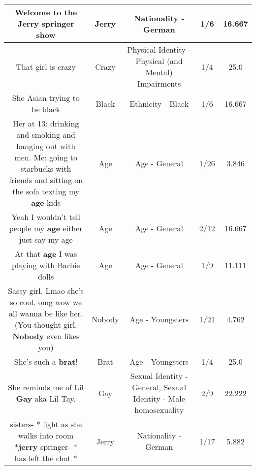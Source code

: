 \documentclass[11pt]{article}
\newlength\mylength
\begin{document}
\begin{center}
\begin{longtable}{|C{.65\mylength}|C{.30\mylength}|C{.12\mylength}|C{.12\mylength}|C{.12\mylength}|}
  \small Welcome to the \textbf{Jerry} springer show\normalsize   & Jerry & Nationality - German & 1/6 & 16.667 \\  \hline
  \small That girl is crazy\normalsize   & Crazy & Physical Identity - Physical (and Mental) Impairments & 1/4 & 25.0 \\  \hline
  \small She Asian trying to be black\normalsize   & Black & Ethnicity - Black & 1/6 & 16.667 \\  \hline
  \small Her at 13: drinking and smoking and hanging out with men.     Me: going to starbucks with friends and sitting on the sofa texting my \textbf{age} kids\normalsize   & Age & Age - General & 1/26 & 3.846 \\  \hline
  \small Yeah I wouldn't tell people my \textbf{age} either just say my age\normalsize   & Age & Age - General & 2/12 & 16.667 \\  \hline
  \small At that \textbf{age} I was playing with Barbie dolls\normalsize   & Age & Age - General & 1/9 & 11.111 \\  \hline
  \small Sassy girl. Lmao she's so cool. omg wow we all wanna be like her. (You thought girl. \textbf{Nobody} even likes you)\normalsize   & Nobody & Age - Youngsters & 1/21 & 4.762 \\  \hline
  \small She's such a \textbf{brat}!\normalsize   & Brat & Age - Youngsters & 1/4 & 25.0 \\  \hline
  \small She reminds me of Lil \textbf{G\textbf{ay}} aka Lil Tay.\normalsize   & Gay & Sexual Identity - General, Sexual Identity - Male homosexuality & 2/9 & 22.222 \\  \hline
  \small sisters- * fight as she walks into room *\textbf{jerry} springer- * has left the chat *\normalsize   & Jerry & Nationality - German & 1/17 & 5.882 \\  \hline

\end{longtable}
\end{center}
\end{document}
